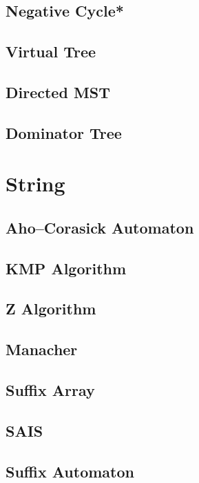 \subsection{Negative Cycle*}

\subsection{Virtual Tree}

\subsection{Directed MST}

\subsection{Dominator Tree}


\section{String}
\subsection{Aho–Corasick Automaton}

\subsection{KMP Algorithm}

\subsection{Z Algorithm}

\subsection{Manacher}

\subsection{Suffix Array}

\subsection{SAIS}

\subsection{Suffix Automaton}

